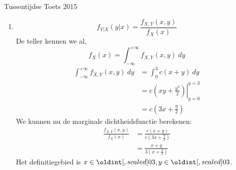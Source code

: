 \documentclass[main.tex]{subfiles}
\begin{document}
\begin{examenvraag}{Tussentijdse Toets 2015}
\begin{ex-antwoord}
\begin{enumerate}
\begin{figure}[H]
        \caption{Het universum}
      \end{figure}
      We zouden dit kunnen uitrekenen als $\int_{0}^{3}\int_{0}^{1}f_{X,Y}(x,y)\ dy dx + \int_{0}^{1}\int_{0}^{3}f_{X,Y}(x,y)\ dy dx - \int_{0}^{1}\int_{0}^{1}f_{X,Y}(x,y)\ dy dx$, maar omdat we eigenlijk niet graag veel integralen uitrekenen kunnen we het eenvoudiger doen door naar te tekening te kijken:
      \[ P(X < 1 \cup Y < 1) = 1 - \int_{1}^{3}\int_{1}^{3}f_{X,Y}(x,y)\ dy dx \]
      \begin{align*}
        \int_{1}^{3}\int_{1}^{3}f_{X,Y}(x,y)\ dy dx 
        &= \int_{1}^{3}\int_{1}^{3}c(x+y)\ dy dx\\
        &= c\int_{1}^{3}\left.\left(xy+\frac{y^{2}}{2}\right)\right|_{y=1}^{y=3}\ dx\\
        &= c\int_{1}^{3}\left(3x + \frac{9}{2} - x - \frac{1}{2}\right)\ dx\\
        &= c\int_{1}^{3}(2x + 4)\ dx\\
        &= c\left.\left(x^{2} + 4x\right)\right|_{x=1}^{x=3}\\
        &= c\left(9 + 12 - 1 - 4\right)\\
        &= 16c
      \end{align*}
      Het antwoord is dus $P(X < 1 \cup Y < 1) = 11c$.

    \item {}
      \[ f_{Y|X}(y|x) = \frac{f_{X,Y}(x,y)}{f_{X}(x)} \]
      De teller kennen we al, 
      \[ f_{X}(x) = \int_{-\infty}^{+\infty}f_{X,Y}(x,y)\ dy \]
      \begin{align*}
        \int_{-\infty}^{+\infty}f_{X,Y}(x,y)\ dy
        &= \int_{0}^{3}c(x+y)\ dy\\
        &= c\left.\left(xy + \frac{y^{2}}{2}\right)\right|_{y=0}^{y=3}\\
        &= c\left(3x + \frac{9}{2}\right)
      \end{align*}
      We kunnen nu de marginale dichtheidsfunctie berekenen:
      \begin{align*}
        \frac{f_{X,Y}(x,y)}{f_{X}(x)}
        &= \frac{c(x+y)}{c\left(3x + \frac{9}{2}\right)}\\
        &= \frac{x+y}{3\left(x+\frac{3}{2}\right)}
      \end{align*}
      Het definitiegebied is $x\in\interval{0}{3}, y\in\interval{0}{3}$.
    \end{enumerate}
  \end{ex-antwoord}
\end{examenvraag}
\end{document}
